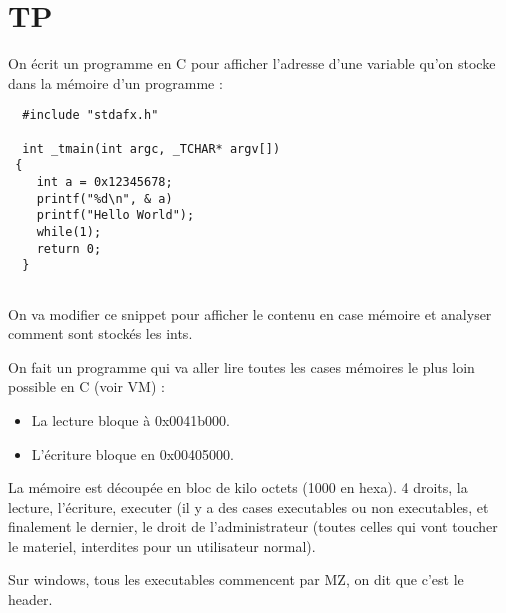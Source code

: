 \documentclass[a4paper,10pt]{article}
\begin{document}
 \section{TP}
 
 On écrit un programme en C pour afficher l'adresse d'une variable qu'on stocke dans la mémoire d'un programme : 
 
\begin{lstlisting}
  #include "stdafx.h"
  
  int _tmain(int argc, _TCHAR* argv[])
 {
    int a = 0x12345678;
    printf("%d\n", & a)
    printf("Hello World");
    while(1);
    return 0;
  }
  
\end{lstlisting}

On va modifier ce snippet pour afficher le contenu en case mémoire et analyser comment sont stockés les ints.

On fait un programme qui va aller lire toutes les cases mémoires le plus loin possible en C (voir VM) : 
\begin{itemize}
 \item La lecture bloque à 0x0041b000.
 \item L'écriture bloque en 0x00405000.
\end{itemize}

La mémoire est découpée en bloc de kilo octets (1000 en hexa).
4 droits, la lecture, l'écriture, executer (il y a des cases executables ou non executables, et finalement le dernier, le droit de l'administrateur (toutes celles qui vont toucher le materiel, interdites pour un utilisateur normal).


Sur windows, tous les executables commencent par MZ, on dit que c'est le header.
\begin{center}


\end{center}
\end{document}
